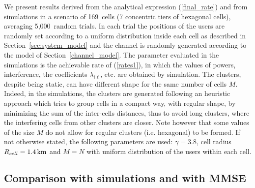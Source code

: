 We present results derived from the analytical expression (\ref{final_rate}) and from simulations in a scenario of 169~cells (7 concentric tiers of hexagonal cells), averaging 5,000~random trials. 
In each trial the positions of the users are randomly set according to a uniform distribution inside each cell as described in Section~\ref{sec:system_model} and the channel is randomly generated according to the model of Section~\ref{channel_model}. 
The parameter evaluated in the simulations is the achievable rate of (\ref{rates1}), in which the values of powers, interference, the coefficients $\lambda_{i\ell}$, etc. are obtained by simulation. 
The clusters, despite being static, can have different shape for the same number of cells $M$. Indeed, in the simulations, the clusters are generated following an heuristic approach which tries to group cells in a compact way, with regular shape, by minimizing the sum of the inter-cells distances, thus to avoid long clusters, where the interfering cells from other clusters are closer.
Note however that some values of the size $M$ do not allow for regular clusters (i.e. hexagonal) to be formed. 
If not otherwise stated, the following parameters are used: $\gamma=3.8$, cell radius $R_{cell}=1.4\,{\rm km}$ and $M=N$ with uniform distribution of the users within each cell.

\subsection{Comparison with simulations and with MMSE}

